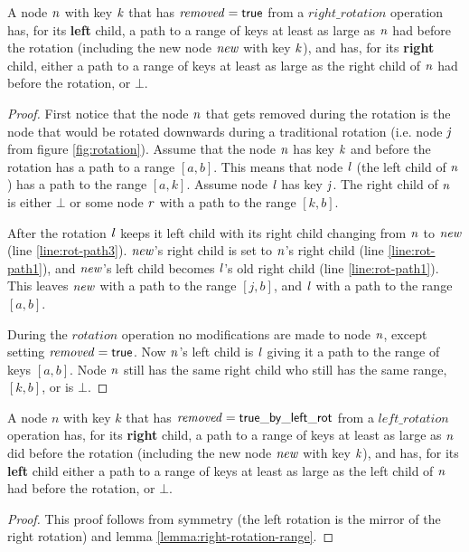 \begin{lemma}
\label{lemma:right-rotation-range}
A node $\ms{n}$ with key $\ms{k}$ that has $\ms{removed}=\lit{true}$ from a $right\_rotation$ operation has, for its \textbf{left} child,
a path to a range of keys at least as large as 
$\ms{n}$ had before the rotation (including the new node $\ms{new}$ with key $\ms{k}$), and has, for its \textbf{right} child,
either a path to a range of keys at least as large as the right child of $\ms{n}$ had before the rotation, or $\bot$.
\end{lemma}
\begin{proof}
First notice that the node $\ms{n}$ that gets removed during the rotation is the node that would
be rotated downwards during a traditional rotation (i.e. node $\ms{j}$ from figure \ref{fig:rotation}).
Assume that the node $\ms{n}$ has key $\ms{k}$ and before the rotation has a path to a range $[a, b]$.
This means that node $\ms{l}$ (the left child of $\ms{n}$) has a path to the range $[a, k]$.
Assume node $\ms{l}$ has key $\ms{j}$.
The right child of $\ms{n}$ is either $\bot$ or some node $\ms{r}$ with a path to the range $[k, b]$.

After the rotation $\ms{l}$ keeps it left child with its right child changing from $\ms{n}$ to $\ms{new}$ (line \ref{line:rot-path3}).
$\ms{new}$'s right child is set to $\ms{n}$'s right child (line \ref{line:rot-path1}), and $\ms{new}$'s left child becomes $\ms{l}$'s old right child (line \ref{line:rot-path1}).
This leaves $\ms{new}$ with a path to the range $[j, b]$, and $\ms{l}$ with a path to the range $[a, b]$.

During the $rotation$ operation no modifications are made to node $\ms{n}$, except setting $\ms{removed}=\lit{true}$.
Now $\ms{n}$'s left child is $\ms{l}$ giving it a path to the range of keys $[a, b]$.
Node $\ms{n}$ still has the same right child who still has the same range, $[k, b]$, or is $\bot$.
\end{proof}



\begin{lemma}
\label{lemma:left-rotation-range}
A node $n$ with key $k$ that has $\ms{removed}=\lit{true\_by\_left\_rot}$ from a $left\_rotation$ operation has,
for its \textbf{right} child, a path to a range of keys at least as large as
$\ms{n}$ did before the rotation (including the new node $\ms{new}$ with key $\ms{k}$), and has, for its \textbf{left} child
either a path to a range of keys at least as large as the left child of $\ms{n}$ had before the rotation, or $\bot$.
\end{lemma}
\begin{proof}
This proof follows from symmetry (the left rotation is the mirror of the right rotation) and lemma \ref{lemma:right-rotation-range}.
\end{proof}


